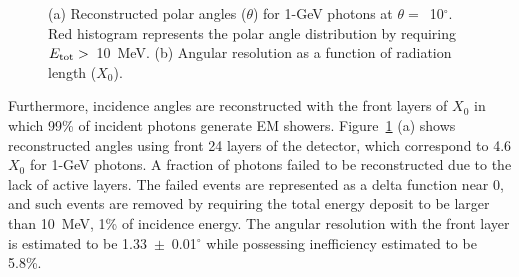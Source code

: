 \documentclass[preprint,12pt,times,a4paper]{elsarticle}
\begin{document}
\begin{figure}[!hbt]
\centering
{}
\caption{ (a) Reconstructed polar angles ($\theta$) for 1-GeV photons at $\theta=$~10$^{\circ}$. Red histogram represents the polar angle distribution by requiring $E_{\rm{tot}}>$~10~MeV. (b) Angular resolution as a function of radiation length ($X_{0}$).}
\label{fig:angle_reco_layer}
\end{figure}

Furthermore, incidence angles are reconstructed with the front layers of $X_{0}$ in which 99\% of incident photons generate EM showers. Figure~\ref{fig:angle_reco_layer} (a) shows reconstructed angles using front 24 layers of the detector, which correspond to 4.6$X_{0}$ for 1-GeV photons. A fraction of photons failed to be reconstructed due to the lack of active layers. The failed events are represented as a delta function near 0, and such events are removed by requiring the total energy deposit to be larger than 10~MeV, 1\% of incidence energy. The angular resolution with the front layer is estimated to be 1.33~$\pm$~0.01$^{\circ}$ while possessing inefficiency estimated to be 5.8\%.
\end{document}
